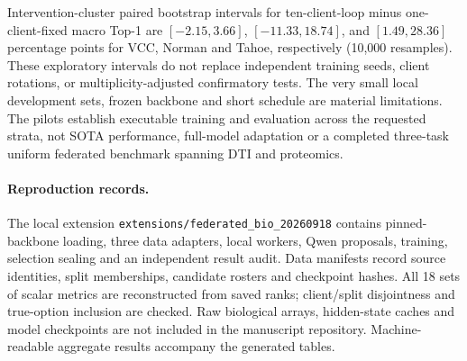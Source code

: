 Intervention-cluster paired bootstrap intervals for ten-client-loop minus one-client-fixed macro Top-1 are $[-2.15,3.66]$, $[-11.33,18.74]$, and $[1.49,28.36]$ percentage points for VCC, Norman and Tahoe, respectively (10,000 resamples). These exploratory intervals do not replace independent training seeds, client rotations, or multiplicity-adjusted confirmatory tests. The very small local development sets, frozen backbone and short schedule are material limitations. The pilots establish executable training and evaluation across the requested strata, not SOTA performance, full-model adaptation or a completed three-task uniform federated benchmark spanning DTI and proteomics.

\paragraph{Reproduction records.}
The local extension \texttt{extensions/federated\_bio\_20260918} contains pinned-backbone loading, three data adapters, local workers, Qwen proposals, training, selection sealing and an independent result audit. Data manifests record source identities, split memberships, candidate rosters and checkpoint hashes. All 18 sets of scalar metrics are reconstructed from saved ranks; client/split disjointness and true-option inclusion are checked. Raw biological arrays, hidden-state caches and model checkpoints are not included in the manuscript repository. Machine-readable aggregate results accompany the generated tables.

